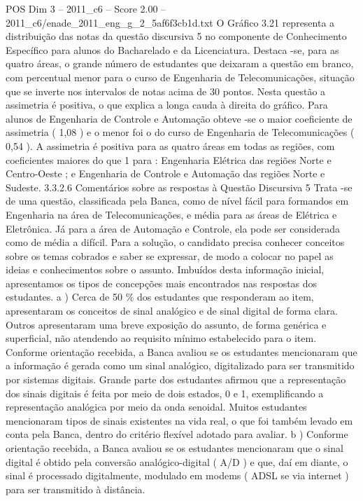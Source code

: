 \begin{textsample}{POS Dim 3 – 2011\_c6 – Score 2.00 – 2011\_c6/enade\_2011\_eng\_g\_2\_5af6f3cb1d.txt}
O Gráfico 3.21 representa a distribuição das notas da questão discursiva 5 no componente de Conhecimento Específico para alunos do Bacharelado e da Licenciatura.
Destaca -se, para as quatro áreas, o grande número de estudantes que deixaram a questão em branco, com percentual menor para o curso de Engenharia de Telecomunicações, situação que se inverte nos intervalos de notas acima de 30 pontos.
Nesta questão a assimetria é positiva, o que explica a longa cauda à direita do gráfico.
Para alunos de Engenharia de Controle e Automação obteve -se o maior coeficiente de assimetria ( 1,08 ) e o menor foi o do curso de Engenharia de Telecomunicações ( 0,54 ).
A assimetria é positiva para as quatro áreas em todas as regiões, com coeficientes maiores do que 1 para : Engenharia Elétrica das regiões Norte e Centro-Oeste ; e Engenharia de Controle e Automação das regiões Norte e Sudeste. 3.3.2.6 Comentários sobre as respostas à Questão Discursiva 5 Trata -se de uma questão, classificada pela Banca, como de nível fácil para formandos em Engenharia na área de Telecomunicações, e média para as áreas de Elétrica e Eletrônica.
Já para a área de Automação e Controle, ela pode ser considerada como de média a difícil.
Para a solução, o candidato precisa conhecer conceitos sobre os temas cobrados e saber se expressar, de modo a colocar no papel as ideias e conhecimentos sobre o assunto.
Imbuídos desta informação inicial, apresentamos os tipos de concepções mais encontrados nas respostas dos estudantes. a ) Cerca de 50 \% dos estudantes que responderam ao item, apresentaram os conceitos de sinal analógico e de sinal digital de forma clara.
Outros apresentaram uma breve exposição do assunto, de forma genérica e superficial, não atendendo ao requisito mínimo estabelecido para o item.
Conforme orientação recebida, a Banca avaliou se os estudantes mencionaram que a informação é gerada como um sinal analógico, digitalizado para ser transmitido por sistemas digitais.
Grande parte dos estudantes afirmou que a representação dos sinais digitais é feita por meio de dois estados, 0 e 1, exemplificando a representação analógica por meio da onda senoidal.
Muitos estudantes mencionaram tipos de sinais existentes na vida real, o que foi também levado em conta pela Banca, dentro do critério flexível adotado para avaliar. b ) Conforme orientação recebida, a Banca avaliou se os estudantes mencionaram que o sinal digital é obtido pela conversão analógico-digital ( A/D ) e que, daí em diante, o sinal é processado digitalmente, modulado em modems ( ADSL se via internet ) para ser transmitido à distância.

\end{textsample}
